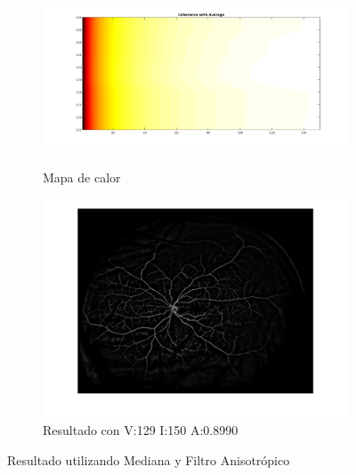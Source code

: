 \begin{figure}[H]
\begin{subfigure}[b]{0.48\textwidth}
        \includegraphics[height=5.3cm,width=1\textwidth]{./Figures/Results/coherenceWithAverageColorMap.png}
        \caption{Mapa de calor}
        \label{fig:thermalforanisodiffwithmedianacentered}
  \end{subfigure}
  \begin{subfigure}[b]{0.48\textwidth}
        \includegraphics[width=1\textwidth]{./Figures/Results/coherenceWithAverageV129I150.png}
        \caption{Resultado con V:129 I:150 A:0.8990}
        \label{fig:thermalforanisodiffwithmedianacentered}
  \end{subfigure}
	\label{fig:thermalfigure}
	\caption{Resultado utilizando Mediana y Filtro Anisotr\'opico}
\end{figure}


